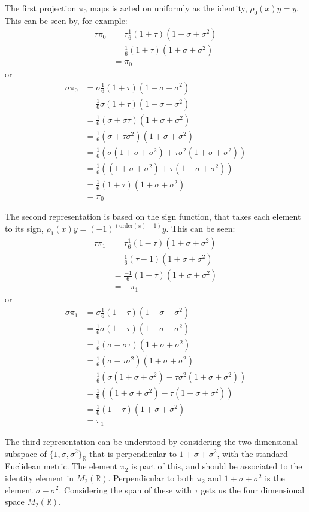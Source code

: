 \documentclass[a5paper]{article}
\renewcommand{\t}{\tau}
\newcommand{\s}{\sigma}
\newcommand{\R}{\mathbb{R}}
\newcommand{\order}{\text{order}}
\begin{document}
The first projection $\pi_0$ maps is acted on uniformly as
the identity, $\rho_0(x)y = y$. This can be seen by, for example:
\begin{align*}
    \t \pi_0 &= \t\frac{1}{6}(1+\t)(1+\s+\s^2) \\
     &= \frac{1}{6}(1+\t)(1+\s+\s^2) \\
     &= \pi_0
\end{align*}
or
\begin{align*}
    \s \pi_0 &= \s\frac{1}{6}(1+\t)(1+\s+\s^2) \\
     &= \frac{1}{6}\s(1+\t)(1+\s+\s^2) \\
     &= \frac{1}{6}(\s+\s\t)(1+\s+\s^2) \\
     &= \frac{1}{6}(\s+\t\s^2)(1+\s+\s^2) \\
     &= \frac{1}{6}(\s(1+\s+\s^2) +\t\s^2(1+\s+\s^2))\\
     &= \frac{1}{6}((1+\s+\s^2) +\t(1+\s+\s^2))\\
     &= \frac{1}{6}(1+\t)(1+\s+\s^2) \\
     &= \pi_0
\end{align*}

The second representation is based on the sign function, that takes
each element to its sign, $\rho_1(x)y = (-1)^{(\order(x)-1)}y$. This
can be seen:
\begin{align*}
    \t \pi_1 &= \t\frac{1}{6}(1-\t)(1+\s+\s^2) \\
     &= \frac{1}{6}(\t-1)(1+\s+\s^2) \\
     &= \frac{-1}{6}(1-\t)(1+\s+\s^2) \\
     &= -\pi_1
\end{align*}
or
\begin{align*}
    \s \pi_1 &= \s\frac{1}{6}(1-\t)(1+\s+\s^2) \\
     &= \frac{1}{6}\s(1-\t)(1+\s+\s^2) \\
     &= \frac{1}{6}(\s-\s\t)(1+\s+\s^2) \\
     &= \frac{1}{6}(\s-\t\s^2)(1+\s+\s^2) \\
     &= \frac{1}{6}(\s(1+\s+\s^2) - \t\s^2(1+\s+\s^2))\\
     &= \frac{1}{6}((1+\s+\s^2) - \t(1+\s+\s^2))\\
     &= \frac{1}{6}(1-\t)(1+\s+\s^2) \\
     &= \pi_1
\end{align*}

The third representation can be understood by considering the two dimensional
subspace of $\{1,\s,\s^2\}_\R$ that is perpendicular to $1 + \s + \s^2$, with
the standard Euclidean metric. The element $\pi_2$ is part of this, and should
be associated to the identity element in $M_2(\R)$. Perpendicular to both
$\pi_2$ and $1+\s+\s^2$ is the element $\s-\s^2$. Considering the span of these
with $\t$ gets us the four dimensional space $M_2(\R)$.
\end{document}
